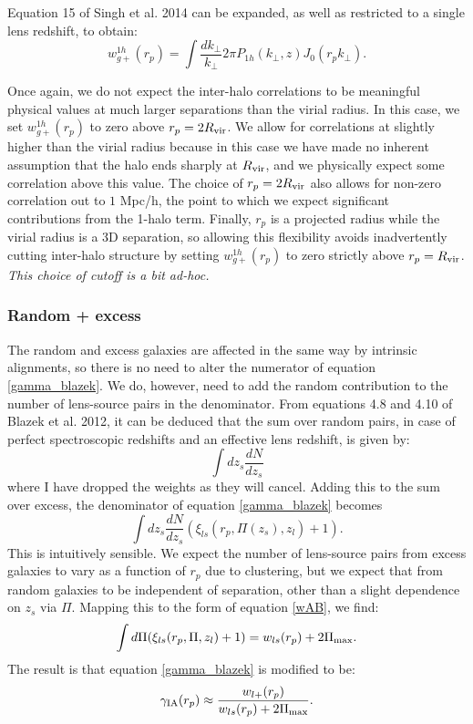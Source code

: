 \documentclass[onecolumn,amsmath,aps,fleqn, superscriptaddress]{revtex4}
\begin{document}
Equation 15 of Singh et al. 2014 can be expanded, as well as restricted to a single lens redshift, to obtain:
\begin{equation}
w_{g+}^{1h}(r_p) = \int \frac{dk_\perp}{k_\perp}{2\pi} P_{1h}(k_\perp,z) J_0(r_p k_\perp).
\label{wg1h}
\end{equation}

Once again, we do not expect the inter-halo correlations to be meaningful physical values at much larger separations than the virial radius. In this case, we set $w_{g+}^{1h}(r_p)$ to zero above $r_p = 2 R_{\rm vir}$. We allow for correlations at slightly higher than the virial radius because in this case we have made no inherent assumption that the halo ends sharply at $R_{\rm vir}$, and we physically expect some correlation above this value. The choice of $r_p = 2 R_{\rm vir}$ also allows for non-zero correlation out to $1$ Mpc/h, the point to which we expect significant contributions from the 1-halo term. Finally, $r_p$ is a projected radius while the virial radius is a 3D separation, so allowing this flexibility avoids inadvertently cutting inter-halo structure by setting $w_{g+}^{1h}(r_p)$ to zero strictly above $r_p = R_{\rm vir}$. {\it This choice of cutoff is a bit ad-hoc.}

\subsubsection*{Random + excess}
The random and excess galaxies are affected in the same way by intrinsic alignments, so there is no need to alter the numerator of equation \ref{gamma_blazek}.
 We do, however, need to add the random contribution to the number of lens-source pairs in the denominator. From equations 4.8 and 4.10 of Blazek et al. 2012, it can be deduced that the sum over random pairs, in case of perfect spectroscopic redshifts and an effective lens redshift, is given by:
\begin{equation}
\int dz_s \frac{dN}{dz_s} 
\end{equation}
where I have dropped the weights as they will cancel. Adding this to the sum over excess, the denominator of equation \ref{gamma_blazek} becomes
\begin{equation}
\int dz_s \frac{dN}{dz_s} \left(\xi_{ls}(r_p, \Pi(z_s), z_l) + 1\right).
\label{denom_rand}
\end{equation}
This is intuitively sensible. We expect the number of lens-source pairs from excess galaxies to vary as a function of $r_p$ due to clustering, but we expect that from random galaxies to be independent of separation, other than a slight dependence on $z_s$ via $\Pi$. Mapping this to the form of equation \ref{wAB}, we find:
\begin{equation}
\int d\Pi (\xi_{ls}(r_p, \Pi, z_l) + 1) = w_{ls}(r_p) + 2\Pi_{\rm max}.
\label{wl}
\end{equation}
The result is that equation \ref{gamma_blazek} is modified to be:
\begin{equation}
\gamma_{\rm IA}(r_p) \approx \frac{w_{l+}(r_p)}{w_{ls}(r_p) + 2 \Pi_{\rm max}}.
\label{gamma_blazek_randoms}
\end{equation} 
\end{document}
